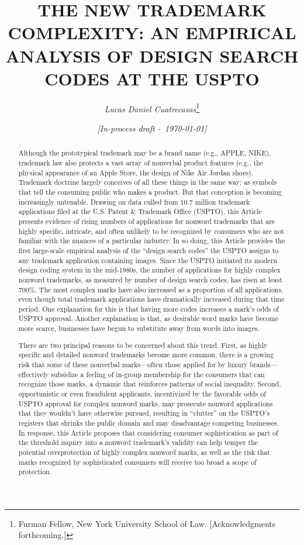 \documentclass[letterpaper, 11pt, oneside]{article}
\title{\Large{\uppercase{The New Trademark Complexity: An Empirical Analysis of Design Search Codes at the USPTO}}}
\author{\large\textit{Lucas Daniel Cuatrecasas}\thanks{Furman Fellow, New York University School of Law. [Acknowledgments forthcoming.]}}
\date{\textit{\small [In-process draft -\ \today]}}
\begin{document}
\maketitle\thispagestyle{firstpage}

\begin{abstract}

\begin{itshape}

Although the prototypical trademark may be a brand name (e.g., APPLE, NIKE), trademark law also protects a vast array of nonverbal product features (e.g., the physical appearance of an Apple Store, the design of Nike Air Jordan shoes). Trademark doctrine largely conceives of all these things in the same way: as symbols that tell the consuming public who makes a product. But that conception is becoming increasingly untenable. Drawing on data culled from 10.7 million trademark applications filed at the U.S. Patent \& Trademark Office (USPTO), this Article presents evidence of rising numbers of applications for nonword trademarks that are highly specific, intricate, and often unlikely to be recognized by consumers who are not familiar with the nuances of a particular industry. In so doing, this Article provides the first large-scale empirical analysis of the ``design search codes'' the USPTO assigns to any trademark application containing images. Since the USPTO initiated its modern design coding system in the mid-1980s, the number of applications for highly complex nonword trademarks, as measured by number of design search codes, has risen at least 700\%. The most complex marks have also increased as a proportion of all applications, even though total trademark applications have dramatically increased during that time period. One explanation for this is that having more codes increases a mark's odds of USPTO approval. Another explanation is that, as desirable word marks have become more scarce, businesses have begun to substitute away from words into images.

There are two principal reasons to be concerned about this trend. First, as highly specific and detailed nonword trademarks become more common, there is a growing risk that some of these nonverbal marks—often those applied for by luxury brands—effectively subsidize a feeling of in-group membership for the consumers that can recognize those marks, a dynamic that reinforces patterns of social inequality. Second, opportunistic or even fraudulent applicants, incentivized by the favorable odds of USPTO approval for complex nonword marks, may prosecute nonword applications that they wouldn't have otherwise pursued, resulting in ``clutter'' on the USPTO's registers that shrinks the public domain and may disadvantage competing businesses. In response, this Article proposes that considering consumer sophistication as part of the threshold inquiry into a nonword trademark's validity can help temper the potential overprotection of highly complex nonword marks, as well as the risk that marks recognized by sophisticated consumers will receive too broad a scope of protection.

\end{itshape}

\end{abstract}
\end{document}
